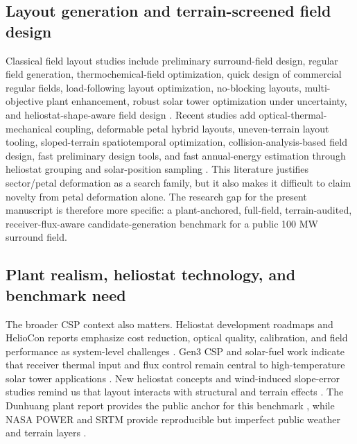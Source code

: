 \documentclass[final,3p,times]{elsarticle}
\begin{document}
\subsection{Layout generation and terrain-screened field design}
Classical field layout studies include preliminary surround-field design, regular field generation, thermochemical-field optimization, quick design of commercial regular fields, load-following layout optimization, no-blocking layouts, multi-objective plant enhancement, robust solar tower optimization under uncertainty, and heliostat-shape-aware field design \cite{collado2009surrounding,collado2012campo,noone2011thermochemical,noone2019quick,ghirardi2021loadfollowing,derbal2023noblocking,guo2020multiobjective,li2022robust,chen2020shapes}. Recent studies add optical-thermal-mechanical coupling, deformable petal hybrid layouts, uneven-terrain layout tooling, sloped-terrain spatiotemporal optimization, collision-analysis-based field design, fast preliminary design tools, and fast annual-energy estimation through heliostat grouping and solar-position sampling \cite{yang2024otm,tang2025petal,ghazanfari2025hefaal,yu2026slopedterrain,adam2026heliosliders,biencinto2025hefesto,liu2026fastannual}. This literature justifies sector/petal deformation as a search family, but it also makes it difficult to claim novelty from petal deformation alone. The research gap for the present manuscript is therefore more specific: a plant-anchored, full-field, terrain-audited, receiver-flux-aware candidate-generation benchmark for a public 100 MW surround field.

\subsection{Plant realism, heliostat technology, and benchmark need}
The broader CSP context also matters. Heliostat development roadmaps and HelioCon reports emphasize cost reduction, optical quality, calibration, and field performance as system-level challenges \cite{pfahl2017progress,zhu2022roadmap,zhu2023heliocon,zhu2024helioconannual}. Gen3 CSP and solar-fuel work indicate that receiver thermal input and flux control remain central to high-temperature solar tower applications \cite{turchi2021gen3,zoller2022solarfuels}. New heliostat concepts and wind-induced slope-error studies remind us that layout interacts with structural and terrain effects \cite{freeman2025tiltroll,li2026windslope}. The Dunhuang plant report provides the public anchor for this benchmark \cite{huang2024dunhuang}, while NASA POWER and SRTM provide reproducible but imperfect public weather and terrain layers \cite{nasa2023power,usgs2015srtm}.
\end{document}
